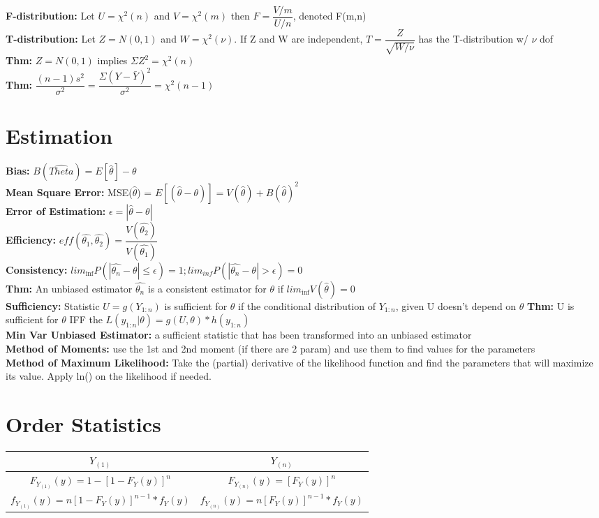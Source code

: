 \documentclass{article}
\begin{document}
\begin{multicols}{2}
\begin{tabular}{|c|c|c|c|}
\end{tabular}\\
\textbf{F-distribution:} Let $U = \chi^2(n)$ and $V = \chi^2(m)$ then  $F = \dfrac{V/m}{U/n}$, denoted F(m,n)\\
\textbf{T-distribution:} Let $Z = N(0,1)$ and $W = \chi^2(\nu)$. If Z and W are independent, $T = \dfrac{Z}{\sqrt{W/\nu}}$ has the T-distribution w/ $\nu$ dof\\ 
\textbf{Thm:} $Z = N(0,1)$ implies $\Sigma Z^2 = \chi^2(n)$ \\ 
\textbf{Thm:} $\dfrac{(n-1)s^2}{\sigma^2} = \dfrac{\Sigma (Y-\bar{Y})^2}{\sigma^2} = \chi^2(n-1)$

\section{Estimation}
\textbf{Bias:} $B(\hat{Theta}) = E[\hat{\theta}] - \theta$ \\
\textbf{Mean Square Error:} 
MSE($\hat{\theta}$) = $E[(\hat{\theta} - \theta)] = V(\hat{\theta}) + B(\hat{\theta})^2$ \\
\textbf{Error of Estimation:} $\epsilon = |\hat{\theta} - \theta|$\\
\textbf{Efficiency:} $eff(\hat{\theta_1}, \hat{\theta_2}) = \dfrac{V(\hat{\theta_2})}{V(\hat{\theta_1})}$\\
\textbf{Consistency:} $lim_{\inf}P(|\hat{\theta_n}-\theta|\leq \epsilon) = 1; lim_{inf}P(|\hat{\theta_n}-\theta|> \epsilon) = 0$ \\
\textbf{Thm:} An unbiased estimator $\hat{\theta_n}$ is a consistent estimator for $\theta$ if $lim_{\inf}V(\hat{\theta}) = 0$ \\
\textbf{Sufficiency:} Statistic $U = g(Y_{1:n})$ is sufficient for $\theta$ if the conditional distribution of $Y_{1:n}$, given U doesn't depend on $\theta$
\textbf{Thm:} U is sufficient for $\theta$ IFF the $L(y_{1:n}|\theta) = g(U, \theta)*h(y_{1:n})$\\
\textbf{Min Var Unbiased Estimator:} a sufficient statistic that has been transformed into an unbiased estimator\\
\textbf{Method of Moments:} use the 1st and 2nd moment (if there are 2 param) and use them to find values for the parameters\\
\textbf{Method of Maximum Likelihood:} Take the (partial) derivative of the likelihood function and find the parameters that will maximize its value. Apply ln() on the likelihood if needed.

\section{Order Statistics}
\begin{tabular}{|c|c|}
\hline
\textbf{$Y_{(1)}$} & \textbf{$Y_{(n)}$} \\ \hline
$F_{Y_{(1)}}(y) = 1-[1-F_Y(y)]^{n}$ & $F_{Y_{(n)}}(y) = [F_Y(y)]^{n}$\\ \hline
$f_{Y_{(1)}}(y) = n[1-F_Y(y)]^{n-1}*f_Y(y) $ &
$f_{Y_{(n)}}(y) = n[F_Y(y)]^{n-1}*f_Y(y) $\\ \hline
\end{tabular}


\end{multicols}
\end{document}
